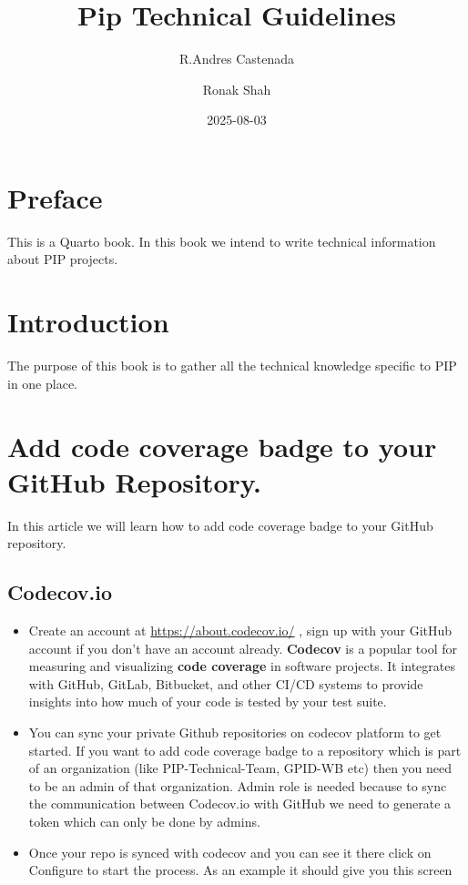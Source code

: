 \documentclass[
  letterpaper,
  DIV=11,
  numbers=noendperiod]{scrreprt}
\title{Pip Technical Guidelines}
\author{R.Andres Castenada \and Ronak Shah}
\date{2025-08-03}
\renewcommand*\contentsname{Table of contents}
\newcommand\contentsname{Table of contents}
\begin{document}
\maketitle

\renewcommand*\contentsname{Table of contents}
{
\hypersetup{linkcolor=}
\setcounter{tocdepth}{2}
\tableofcontents
}


\chapter*{Preface}\label{preface}


This is a Quarto book. In this book we intend to write technical
information about PIP projects.


\chapter{Introduction}\label{introduction}

The purpose of this book is to gather all the technical knowledge
specific to PIP in one place.


\chapter{Add code coverage badge to your GitHub
Repository.}\label{add-code-coverage-badge-to-your-github-repository.}

In this article we will learn how to add code coverage badge to your
GitHub repository.

\section{Codecov.io}\label{codecov.io}

\begin{itemize}
\item
  Create an account at \url{https://about.codecov.io/} , sign up with
  your GitHub account if you don't have an account already.
  \textbf{Codecov} is a popular tool for measuring and visualizing
  \textbf{code coverage} in software projects. It integrates with
  GitHub, GitLab, Bitbucket, and other CI/CD systems to provide insights
  into how much of your code is tested by your test suite.
\item
  You can sync your private Github repositories on codecov platform to
  get started. If you want to add code coverage badge to a repository
  which is part of an organization (like PIP-Technical-Team, GPID-WB
  etc) then you need to be an admin of that organization. Admin role is
  needed because to sync the communication between Codecov.io with
  GitHub we need to generate a token which can only be done by admins.
\item
  Once your repo is synced with codecov and you can see it there click
  on Configure to start the process. As an example it should give you
  this screen
\end{itemize}
\end{document}
